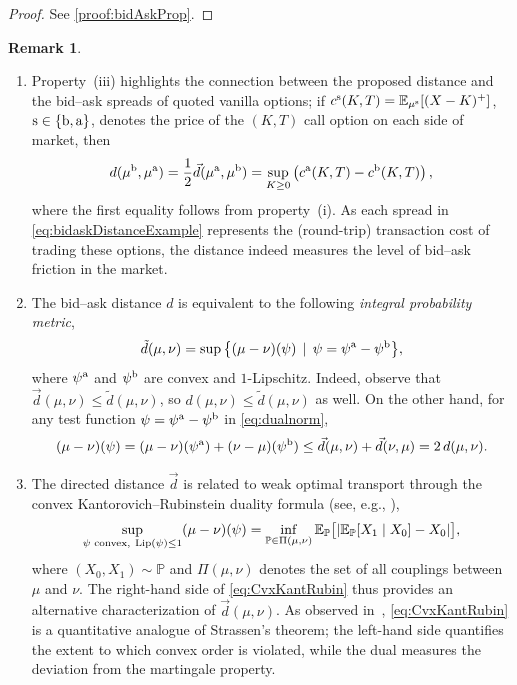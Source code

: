 \documentclass[11pt]{article}
\newcommand{\PP}{\mathbb{P}}
\theoremstyle{plain}
\theoremstyle{definition}
\newtheorem{remark}[theorem]{Remark}
\theoremstyle{remark}
\newcommand{\E}{\mathbb{E}}
\theoremstyle{plain}
\begin{document}
\begin{proof}
    See \cref{proof:bidAskProp}.
\end{proof}


%
%
%
%
%
%

\begin{remark}\label{rmk:bid-ask-distance}
\begin{enumerate}[label=(\alph*)]
\item Property~(iii) highlights the connection between the proposed distance and the bid--ask spreads of quoted vanilla options; if $c^{\rm s}(K,T) = \E_{\mu^{\rm s}}[(X-K)^+]$, $\rm s \in \{\rm b, \rm a\}$, denotes the  price of the $(K,T)$ call option on each side of market, then 
\begin{equation}\label{eq:bidaskDistanceExample}
    d(\mu^{\rm b},\mu^{\rm a}) = \frac{1}{2} \vec{d}(\mu^{\rm a},\mu^{\rm b}) = \sup_{K \ge 0} \left(c^{\rm a}(K,T) - c^{\rm b}(K,T)\right),
\end{equation}
where the first equality follows from property~(i). 
As each spread in \eqref{eq:bidaskDistanceExample} represents the (round-trip) transaction cost of trading these options, the distance indeed  measures the level of bid--ask friction in the market.
\item The bid--ask distance $d$ is equivalent to the following \emph{integral probability metric}, %
\begin{equation}\label{eq:dualnorm}
\tilde{d}(\mu,\nu)
= \sup \big\{(\mu-\nu)(\psi) \, \mid \, \psi=\psi^{\rm a}-\psi^{\rm b}\big\},
\end{equation}
where $\psi^{\rm a}$ and $\psi^{\rm b}$ are convex and $1$-Lipschitz. Indeed, observe that $\vec{d}(\mu,\nu)\le \tilde{d}(\mu,\nu)$, so $d(\mu,\nu)\le \tilde{d}(\mu,\nu)$ as well. On the other hand, for any test function $\psi=\psi^{\rm a}-\psi^{\rm b}$ in \eqref{eq:dualnorm},
\[
(\mu-\nu)(\psi)
= (\mu-\nu)(\psi^{\rm a})+(\nu-\mu)(\psi^{\rm b})
\le \vec{d}(\mu,\nu)+\vec{d}(\nu,\mu)
= 2\,d(\mu,\nu).
\]
\item The directed distance $\vec{d}$ is related to weak optimal transport through the convex Kantorovich--Rubinstein duality formula (see, e.g., \cite{beiglboeck2025}),
\begin{equation}\label{eq:CvxKantRubin}
\sup_{\psi \text{ convex},\ \textnormal{Lip}(\psi)\le 1} (\mu-\nu)(\psi)
= \inf_{\PP \in \Pi(\mu,\nu)} \E_{\PP}\big[|\E_{\PP}[X_1\mid X_0]-X_0|\big],
\end{equation}
where $(X_0,X_1)\sim \PP$ and $\Pi(\mu,\nu)$ denotes the set of all couplings between $\mu$ and $\nu$. The right-hand side of \eqref{eq:CvxKantRubin} thus provides an alternative characterization of $\vec{d}(\mu,\nu)$. As observed in~\cite{beiglboeck2025}, \eqref{eq:CvxKantRubin} is  a quantitative analogue of Strassen's theorem; the left-hand side quantifies the extent to which convex order is violated, while the dual measures the deviation from the martingale property.
\end{enumerate}
\end{remark}
\end{document}

